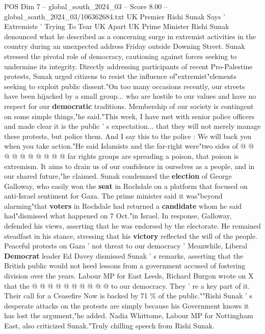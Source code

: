 \begin{textsample}{POS Dim 7 – global\_south\_2024\_03 – Score 8.00 – global\_south\_2024\_03/106362684.txt}  \label{ex:f7_pos_160}
UK Premier Rishi Sunak Says ' Extremists ' Trying To Tear UK Apart UK Prime Minister Rishi Sunak denounced what he described as a concerning surge in extremist activities in the country during an unexpected address Friday outside Downing Street.
Sunak stressed the pivotal role of democracy, cautioning against forces seeking to undermine its integrity.
Directly addressing participants of recent Pro-Palestine protests, Sunak urged citizens to resist the influence of"extremist"elements seeking to exploit public dissent."On too many occasions recently, our streets have been hijacked by a small group... who are hostile to our values and have no respect for our \textbf{democratic} traditions.
Membership of our society is contingent on some simple things,"he said."This week, I have met with senior police officers and made clear it is the public ' s expectation... that they will not merely manage these protests, but police them.
And I say this to the police : We will back you when you take action."He said Islamists and the far-right were"two sides of @ @ @ @ @ @ @ @ @ @ far rights groups are spreading a poison, that poison is extremism.
It aims to drain us of our confidence in ourselves as a people, and in our shared future,"he claimed.
Sunak condemned the \textbf{election} of George Galloway, who easily won the \textbf{seat} in Rochdale on a platform that focused on anti-Israel sentiment for Gaza.
The prime minister said it was"beyond alarming"that \textbf{voters} in Rochdale had returned a \textbf{candidate} whom he said had"dismissed what happened on 7 Oct."in Israel.
In response, Galloway, defended his views, asserting that he was endorsed by the electorate.
He remained steadfast in his stance, stressing that his \textbf{victory} reflected the will of the people.
Peaceful protests on Gaza ' not threat to our democracy ' Meanwhile, Liberal \textbf{Democrat} leader Ed Davey dismissed Sunak ' s remarks, asserting that the British public would not heed lessons from a government accused of fostering division over the years.
Labour MP for East Leeds, Richard Burgon wrote on X that the @ @ @ @ @ @ @ @ @ @ to our democracy.
They ' re a key part of it.
Their call for a Ceasefire Now is backed by 71 \% of the public.""Rishi Sunak ' s desperate attacks on the protests are simply because his Government knows it has lost the argument,"he added.
Nadia Whittome, Labour MP for Nottingham East, also criticized Sunak."Truly chilling speech from Rishi Sunak.

\end{textsample}
